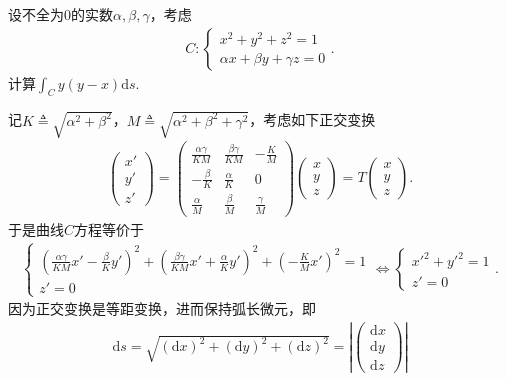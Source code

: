 \documentclass[../../main.tex]{subfiles}%
\begin{document}
\begin{example}
设不全为0的实数$\alpha,\beta,\gamma$，考虑
\begin{align*}
C:
\begin{cases}
x^2 + y^2 + z^2 = 1 \\
\alpha x + \beta y + \gamma z = 0
\end{cases}.
\end{align*}
计算$\int_C y(y - x)\mathrm{d}s$.
\end{example}
\begin{solution}
记$K\triangleq \sqrt{\alpha^2+\beta^2}$，$M\triangleq \sqrt{\alpha^2+\beta^2+\gamma^2}$，考虑如下正交变换
\begin{align*}
\begin{pmatrix}
x'\\
y'\\
z'
\end{pmatrix}
=
\begin{pmatrix}
\frac{\alpha\gamma}{KM} & \frac{\beta\gamma}{KM} & -\frac{K}{M}\\
-\frac{\beta}{K} & \frac{\alpha}{K} & 0\\
\frac{\alpha}{M} & \frac{\beta}{M} & \frac{\gamma}{M}
\end{pmatrix}
\begin{pmatrix}
x\\
y\\
z
\end{pmatrix}
= T
\begin{pmatrix}
x\\
y\\
z
\end{pmatrix}.
\end{align*}
于是曲线$C$方程等价于
\begin{align*}
\begin{cases}
\left( \frac{\alpha\gamma}{KM}x'-\frac{\beta}{K}y' \right)^2+\left( \frac{\beta\gamma}{KM}x'+\frac{\alpha}{K}y' \right)^2+\left( -\frac{K}{M}x' \right)^2=1\\
z' = 0
\end{cases}
\Longleftrightarrow
\begin{cases}
x'^2+y'^2=1\\
z' = 0
\end{cases}.
\end{align*}
因为正交变换是等距变换，进而保持弧长微元，即
\begin{align*}
\mathrm{d}s=\sqrt{(\mathrm{d}x)^2+(\mathrm{d}y)^2+(\mathrm{d}z)^2}
= \left| \begin{pmatrix} \mathrm{d}x\\ \mathrm{d}y\\ \mathrm{d}z \end{pmatrix} \right|

\end{align*}
\end{solution}
\end{document}

